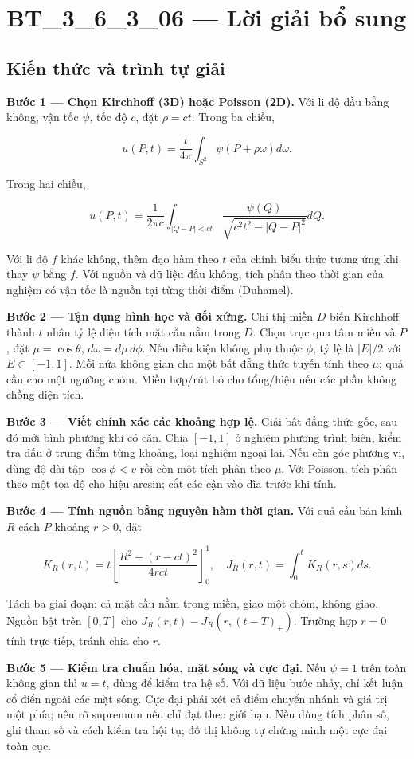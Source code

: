 \documentclass[10pt,a4paper]{article}
\begin{document}
\section*{BT\_3\_6\_3\_06 — Lời giải bổ sung}
\subsection*{Kiến thức và trình tự giải}
\textbf{Bước 1 — Chọn Kirchhoff (3D) hoặc Poisson (2D).} Với li độ đầu bằng không, vận tốc $\psi$, tốc độ $c$, đặt $\rho=ct$. Trong ba chiều,


\[
u(P,t)=\frac t{4\pi}\int_{S^2}\psi(P+\rho\omega)d\omega.
\]


Trong hai chiều,


\[
u(P,t)=\frac1{2\pi c}\int_{|Q-P|<ct}\frac{\psi(Q)}{\sqrt{c^2t^2-|Q-P|^2}}dQ.
\]


Với li độ $f$ khác không, thêm đạo hàm theo $t$ của chính biểu thức tương ứng khi thay $\psi$ bằng $f$. Với nguồn và dữ liệu đầu không, tích phân theo thời gian của nghiệm có vận tốc là nguồn tại từng thời điểm (Duhamel).

\textbf{Bước 2 — Tận dụng hình học và đối xứng.} Chỉ thị miền $D$ biến Kirchhoff thành $t$ nhân tỷ lệ diện tích mặt cầu nằm trong $D$. Chọn trục qua tâm miền và $P$, đặt $\mu=\cos\theta$, $d\omega=d\mu\,d\phi$. Nếu điều kiện không phụ thuộc $\phi$, tỷ lệ là $|E|/2$ với $E\subset[-1,1]$. Mỗi nửa không gian cho một bất đẳng thức tuyến tính theo $\mu$; quả cầu cho một ngưỡng chỏm. Miền hợp/rút bỏ cho tổng/hiệu nếu các phần không chồng diện tích.

\textbf{Bước 3 — Viết chính xác các khoảng hợp lệ.} Giải bất đẳng thức gốc, sau đó mới bình phương khi có căn. Chia $[-1,1]$ ở nghiệm phương trình biên, kiểm tra dấu ở trung điểm từng khoảng, loại nghiệm ngoại lai. Nếu còn góc phương vị, dùng độ dài tập $\cos\phi<v$ rồi còn một tích phân theo $\mu$. Với Poisson, tích phân theo một tọa độ cho hiệu arcsin; cắt các cận vào đĩa trước khi tính.

\textbf{Bước 4 — Tính nguồn bằng nguyên hàm thời gian.} Với quả cầu bán kính $R$ cách $P$ khoảng $r>0$, đặt


\[
K_R(r,t)=t\left[\frac{R^2-(r-ct)^2}{4rct}\right]_0^1,\quad J_R(r,t)=\int_0^tK_R(r,s)ds.
\]


Tách ba giai đoạn: cả mặt cầu nằm trong miền, giao một chỏm, không giao. Nguồn bật trên $[0,T]$ cho $J_R(r,t)-J_R(r,(t-T)_+)$. Trường hợp $r=0$ tính trực tiếp, tránh chia cho $r$.

\textbf{Bước 5 — Kiểm tra chuẩn hóa, mặt sóng và cực đại.} Nếu $\psi=1$ trên toàn không gian thì $u=t$, dùng để kiểm tra hệ số. Với dữ liệu bước nhảy, chỉ kết luận cổ điển ngoài các mặt sóng. Cực đại phải xét cả điểm chuyển nhánh và giá trị một phía; nêu rõ supremum nếu chỉ đạt theo giới hạn. Nếu dùng tích phân số, ghi tham số và cách kiểm tra hội tụ; đồ thị không tự chứng minh một cực đại toàn cục.
\end{document}
